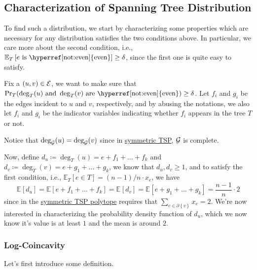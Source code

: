 \subsection{Characterization of Spanning Tree Distribution}
To find such a distribution, we start by characterizing some properties which are necessary for any distribution satisfies the two conditions above. In particular, we care more about the second condition, i.e., \(\mathbb{E}_{T}\left[e \text{ is \hyperref[not:even]{even}} \right] \geq \delta \), since the first one is quite easy to satisfy.

Fix a \((u, v)\in \mathcal{\MakeUppercase{e}} \), we want to make sure that \(\Pr_T(\deg_T(u)\text{ and }\deg_T(v)\text{ are \hyperref[not:even]{even}}) \geq \delta \). Let \(f_i\) and \(g_i\) be the edges incident to \(u\) and \(v\), respectively, and by abusing the notations, we also let \(f_i\) and \(g_i\) be the indicator variables indicating whether \(f_i\) appears in the tree \(T\) or not.
\begin{center}
\end{center}

\begin{note}
	Notice that \(\deg_{\mathcal{\MakeUppercase{g}} }(u) = \deg_{\mathcal{\MakeUppercase{g}} }(v)\) since in \hyperref[prb:STSP]{symmetric TSP}, \(\mathcal{\MakeUppercase{g}} \) is complete.
\end{note}

Now, define \(d_u \coloneqq \deg_{T}(u) = e + f_1 + \ldots  + f_k\) and \(d_v \coloneqq \deg_T(v) = e + g_1 + \ldots  + g_k\), we know that \(d_u, d_v \geq 1\), and to satisfy the first condition, i.e., \(\mathbb{E}_{T}\left[e\in T \right] = (n-1) / n \cdot x_e\), we have
\[
	\mathbb{E}_{}\left[d_u \right] = \mathbb{E}_{}\left[e + f_1 + \ldots + f_k  \right] = \mathbb{E}_{}\left[d_v \right] = \mathbb{E}_{}\left[e + g_1 + \ldots + g_k  \right] = \frac{n-1}{n}\cdot 2
\]
since in the \hyperref[eq:STSP-polytope]{symmetric TSP polytope} requires that \(\sum_{e\in \partial \left\{ v \right\}} x_e = 2\). We're now interested in characterizing the probability density function of \(d_u\), which we now know it's value is at least \(1\) and the mean is around \(2\).

\subsubsection{Log-Coincavity}\label{subsub:log-concavity}
Let's first introduce some definition.

